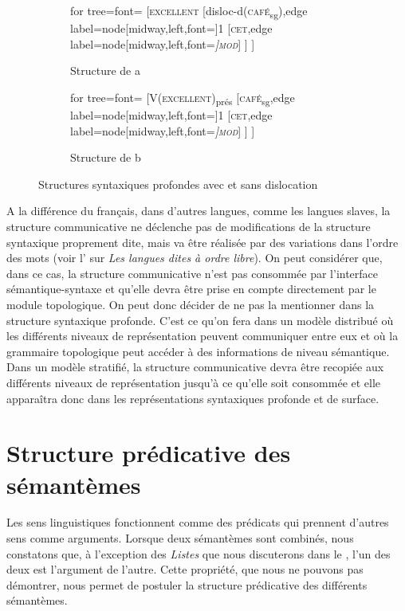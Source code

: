 {\begin{figure}[H]
	\begin{subfigure}[b]{0.5\textwidth}
		\centering
		\begin{forest} for tree={font=\normalfont}
			[\textsc{excellent}
				[disloc-d(\textsc{café}\textsubscript{sg}),edge label={node[midway,left,font=\footnotesize]{1}}
					[\textsc{cet},edge label={node[midway,left,font=\footnotesize\itshape]{\textsc{mod}}}]
				]
			]
		\end{forest}
		\caption{Structure de a}
	\end{subfigure}%
	\hfill
	\begin{subfigure}[b]{0.5\textwidth}
		\centering
		\begin{forest} for tree={font=\normalfont}
			[V(\textsc{excellent})\textsubscript{prés}
				[\textsc{café}\textsubscript{sg},edge label={node[midway,left,font=\footnotesize]{1}}
					[\textsc{cet},edge label={node[midway,left,font=\footnotesize\itshape]{\textsc{mod}}}]
				]
			]
		\end{forest}
		\caption{Structure de b}
	\end{subfigure}
\caption{Structures syntaxiques profondes avec et sans dislocation\label{fig:13-excellent}}
\end{figure}

A la différence du français, dans d’autres langues, comme les langues slaves, la structure communicative ne déclenche pas de modifications de la structure syntaxique proprement dite, mais va être réalisée par des variations dans l’ordre des mots (voir l’ sur \textit{Les langues dites à ordre libre}). On peut considérer que, dans ce cas, la structure communicative n’est pas consommée par l’interface sémantique-syntaxe et qu’elle devra être prise en compte directement par le module topologique. On peut donc décider de ne pas la mentionner dans la structure syntaxique profonde. C’est ce qu’on fera dans un modèle distribué où les différents niveaux de représentation peuvent communiquer entre eux et où la grammaire topologique peut accéder à des informations de niveau sémantique. Dans un modèle stratifié, la structure communicative devra être recopiée aux différents niveaux de représentation jusqu’à ce qu’elle soit consommée et elle apparaîtra donc dans les représentations syntaxiques profonde et de surface.}

\section{Structure prédicative des sémantèmes}\label{sec:13-argument}
Les sens linguistiques fonctionnent comme des prédicats qui prennent d’autres sens comme arguments. Lorsque deux sémantèmes sont combinés, nous constatons que, à l'exception des \textit{Listes} que nous discuterons dans le , l’un des deux est l’argument de l’autre. Cette propriété, que nous ne pouvons pas démontrer, nous permet de postuler la structure prédicative des différents sémantèmes. 

